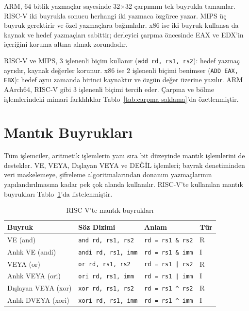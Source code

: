\begin{ornek}[3.11]
ARM, 64 bitlik yazmaçlar sayesinde 32$\times$32 çarpımını tek buyrukla tamamlar. RISC-V iki buyrukla sonucu herhangi iki yazmaca özgürce yazar. MIPS üç buyruk gerektirir ve özel yazmaçlara bağımlıdır. x86 ise iki buyruk kullansa da kaynak ve hedef yazmaçları sabittir; derleyici çarpma öncesinde EAX ve EDX'in içeriğini koruma altına almak zorundadır.
\end{ornek}

\begin{karsilastirma}
RISC-V ve MIPS, 3 işlenenli biçim kullanır (\texttt{add rd, rs1, rs2}): hedef yazmaç ayrıdır, kaynak değerler korunur. x86 ise 2 işlenenli biçimi benimser (\texttt{ADD EAX, EBX}): hedef aynı zamanda birinci kaynaktır ve özgün değer üzerine yazılır. ARM AArch64, RISC-V gibi 3 işlenenli biçimi tercih eder. Çarpma ve bölme işlemlerindeki mimari farklılıklar Tablo~\ref{tab:carpma-saklama}'da özetlenmiştir.
\end{karsilastirma}

\section{Mantık Buyrukları}
\label{sec:mantik-buyruklar}

Tüm işlemciler, aritmetik işlemlerin yanı sıra bit düzeyinde mantık işlemlerini de destekler. VE, VEYA, Dışlayan VEYA ve DEĞİL işlemleri; bayrak denetiminden veri maskelemeye, şifreleme algoritmalarından donanım yazmaçlarının yapılandırılmasına kadar pek çok alanda kullanılır. RISC-V'te kullanılan mantık buyrukları Tablo~\ref{tab:mantik-buyruklar}'da listelenmiştir.

\begin{table}[H]
\centering
\caption{RISC-V'te mantık buyrukları}
\label{tab:mantik-buyruklar}
\begin{tabular}{llll}
\toprule
\textbf{Buyruk} & \textbf{Söz Dizimi} & \textbf{Anlam} & \textbf{Tür} \\
\midrule
VE (and)            & \texttt{and rd, rs1, rs2}   & \texttt{rd = rs1 \& rs2}      & R \\
Anlık VE (andi)     & \texttt{andi rd, rs1, imm}  & \texttt{rd = rs1 \& imm}      & I \\
VEYA (or)           & \texttt{or rd, rs1, rs2}    & \texttt{rd = rs1 | rs2}       & R \\
Anlık VEYA (ori)    & \texttt{ori rd, rs1, imm}   & \texttt{rd = rs1 | imm}       & I \\
Dışlayan VEYA (xor) & \texttt{xor rd, rs1, rs2}  & \texttt{rd = rs1 \^{} rs2}    & R \\
Anlık DVEYA (xori)  & \texttt{xori rd, rs1, imm} & \texttt{rd = rs1 \^{} imm}    & I \\
\bottomrule
\end{tabular}
\end{table}

